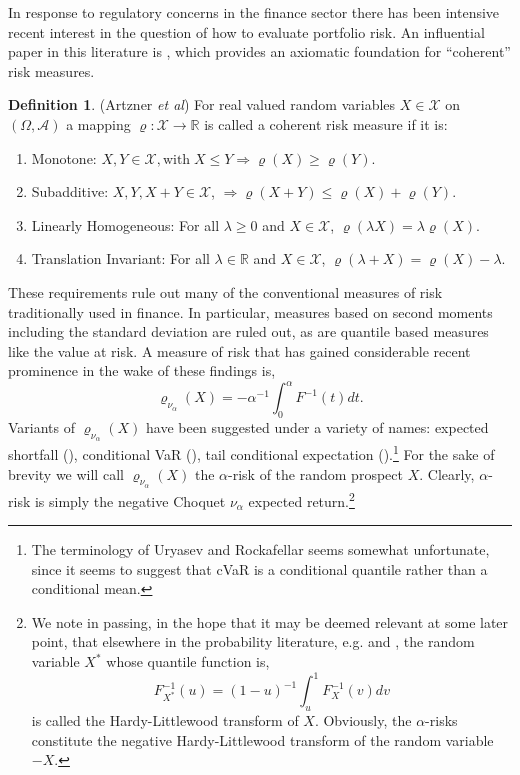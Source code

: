 \documentclass{birkart}
\theoremstyle{definition}
\newtheorem{defn}[theorem]{Definition}
\theoremstyle{remark}
\numberwithin{equation}{section}
\def\RR{\mathbb{R}}
\def\XX{\mathcal X}
\def\AA{\mathcal A}
\begin{document}
In response to regulatory concerns in the finance sector there has been
intensive recent interest in the question of how to evaluate portfolio risk. 
An influential paper in this literature is , 
which provides an axiomatic foundation for ``coherent'' risk measures.
\begin{defn}
(Artzner {\it et al})
For real valued random variables $X \in \XX$ on $(\Omega , \AA)$ 
a mapping $\varrho: \XX \rightarrow \RR$ is called a coherent risk measure 
if it is:
\begin{enumerate}
\item Monotone:  $X,Y \in \XX, \mbox{with} \; X \leq Y \Rightarrow \varrho(X) \geq \varrho (Y)$.
\item Subadditive:  $X,Y,X+Y \in \XX$,  
		$\Rightarrow \varrho(X+Y) \leq \varrho (X) + \varrho (Y)$.
\item Linearly Homogeneous:  For all $\lambda \geq 0$ and $X \in \XX$, 
		$\varrho(\lambda X) = \lambda \varrho (X)$.
\item Translation Invariant:  For all $\lambda \in \RR$ and $X \in \XX$, 
		$\varrho(\lambda + X) = \varrho (X) - \lambda $.
\end{enumerate}
\end{defn}
These requirements rule out many of the conventional measures of risk
traditionally used in finance.  In particular, measures based on second moments
including the standard deviation are ruled out, as are quantile based
measures like the value at risk.  A measure of risk that has gained
considerable recent prominence in the wake of these findings is,
\[
\varrho_{\nu_\alpha} (X) =  - \alpha^{-1}  \int_0^\alpha F^{-1}(t) dt .
\]
Variants of $\varrho_{\nu_\alpha} (X)$ have been suggested 
under a variety of names:  expected shortfall
(), conditional VaR (),
tail conditional expectation ().\footnote{
The terminology of Uryasev and Rockafellar seems somewhat unfortunate, 
since it seems to suggest that cVaR is a conditional quantile rather
than a conditional mean.}
For the sake of brevity we will call 
$\varrho_{\nu_\alpha} (X)$ the $\alpha$-risk
of the random prospect $X$.  Clearly, $\alpha$-risk is simply the
negative Choquet $\nu_\alpha$ expected return.\footnote{ 
We note in passing, in the hope that it may be deemed relevant at 
some later point,
that elsewhere in the probability literature, e.g.  and
, the random variable $X^*$ whose quantile function is,
\[
F_{X^*}^{-1}(u) = (1-u)^{-1} \int_u^1 F_X^{-1} (v)dv
\]
is called the Hardy-Littlewood transform of $X$.  Obviously, the $\alpha$-risks
constitute the negative Hardy-Littlewood transform of the random variable $-X$.} 
\end{document}
